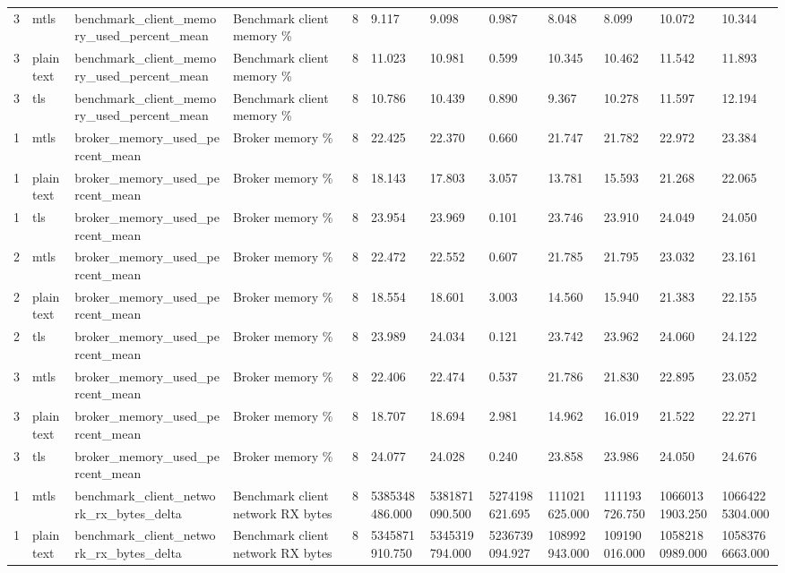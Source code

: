 \begin{longtable}{llllllllllll}
3 & mtls & benchmark\_client\_memory\_used\_percent\_mean & Benchmark client memory \% & 8 & 9.117 & 9.098 & 0.987 & 8.048 & 8.099 & 10.072 & 10.344 \\
3 & plaintext & benchmark\_client\_memory\_used\_percent\_mean & Benchmark client memory \% & 8 & 11.023 & 10.981 & 0.599 & 10.345 & 10.462 & 11.542 & 11.893 \\
3 & tls & benchmark\_client\_memory\_used\_percent\_mean & Benchmark client memory \% & 8 & 10.786 & 10.439 & 0.890 & 9.367 & 10.278 & 11.597 & 12.194 \\
1 & mtls & broker\_memory\_used\_percent\_mean & Broker memory \% & 8 & 22.425 & 22.370 & 0.660 & 21.747 & 21.782 & 22.972 & 23.384 \\
1 & plaintext & broker\_memory\_used\_percent\_mean & Broker memory \% & 8 & 18.143 & 17.803 & 3.057 & 13.781 & 15.593 & 21.268 & 22.065 \\
1 & tls & broker\_memory\_used\_percent\_mean & Broker memory \% & 8 & 23.954 & 23.969 & 0.101 & 23.746 & 23.910 & 24.049 & 24.050 \\
2 & mtls & broker\_memory\_used\_percent\_mean & Broker memory \% & 8 & 22.472 & 22.552 & 0.607 & 21.785 & 21.795 & 23.032 & 23.161 \\
2 & plaintext & broker\_memory\_used\_percent\_mean & Broker memory \% & 8 & 18.554 & 18.601 & 3.003 & 14.560 & 15.940 & 21.383 & 22.155 \\
2 & tls & broker\_memory\_used\_percent\_mean & Broker memory \% & 8 & 23.989 & 24.034 & 0.121 & 23.742 & 23.962 & 24.060 & 24.122 \\
3 & mtls & broker\_memory\_used\_percent\_mean & Broker memory \% & 8 & 22.406 & 22.474 & 0.537 & 21.786 & 21.830 & 22.895 & 23.052 \\
3 & plaintext & broker\_memory\_used\_percent\_mean & Broker memory \% & 8 & 18.707 & 18.694 & 2.981 & 14.962 & 16.019 & 21.522 & 22.271 \\
3 & tls & broker\_memory\_used\_percent\_mean & Broker memory \% & 8 & 24.077 & 24.028 & 0.240 & 23.858 & 23.986 & 24.050 & 24.676 \\
1 & mtls & benchmark\_client\_network\_rx\_bytes\_delta & Benchmark client network RX bytes & 8 & 5385348486.000 & 5381871090.500 & 5274198621.695 & 111021625.000 & 111193726.750 & 10660131903.250 & 10664225304.000 \\
1 & plaintext & benchmark\_client\_network\_rx\_bytes\_delta & Benchmark client network RX bytes & 8 & 5345871910.750 & 5345319794.000 & 5236739094.927 & 108992943.000 & 109190016.000 & 10582180989.000 & 10583766663.000 \\

\end{longtable}
